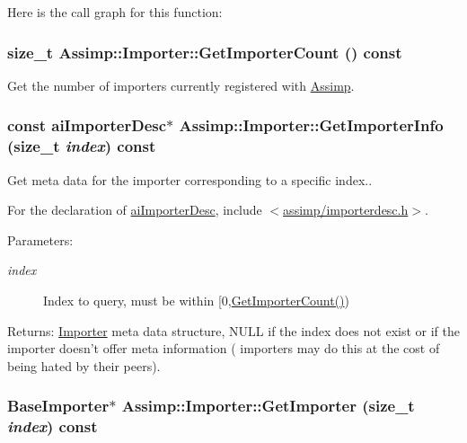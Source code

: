 Here is the call graph for this function:\hypertarget{class_assimp_1_1_importer_fe982451f1a1c9b0b59c788f9329ccc1}{
\subsubsection[GetImporterCount]{\setlength{\rightskip}{0pt plus 5cm}size\_\-t Assimp::Importer::GetImporterCount () const}}
\label{class_assimp_1_1_importer_fe982451f1a1c9b0b59c788f9329ccc1}


Get the number of importers currently registered with \hyperlink{namespace_assimp}{Assimp}. \hypertarget{class_assimp_1_1_importer_857dd22e071521c7747dc909f6a8f6f9}{
\subsubsection[GetImporterInfo]{\setlength{\rightskip}{0pt plus 5cm}const {\bf aiImporterDesc}$\ast$ Assimp::Importer::GetImporterInfo (size\_\-t {\em index}) const}}
\label{class_assimp_1_1_importer_857dd22e071521c7747dc909f6a8f6f9}


Get meta data for the importer corresponding to a specific index..

For the declaration of \hyperlink{structai_importer_desc}{aiImporterDesc}, include $<$\hyperlink{importerdesc_8h}{assimp/importerdesc.h}$>$. \begin{Desc}
\item[Parameters:]
\begin{description}
\item[{\em index}]Index to query, must be within \mbox{[}0,\hyperlink{class_assimp_1_1_importer_fe982451f1a1c9b0b59c788f9329ccc1}{GetImporterCount()}) \end{description}
\end{Desc}
\begin{Desc}
\item[Returns:]\hyperlink{class_assimp_1_1_importer}{Importer} meta data structure, NULL if the index does not exist or if the importer doesn't offer meta information ( importers may do this at the cost of being hated by their peers). \end{Desc}
\hypertarget{class_assimp_1_1_importer_712a0545a11c9d198392867552ba6646}{
\subsubsection[GetImporter]{\setlength{\rightskip}{0pt plus 5cm}BaseImporter$\ast$ Assimp::Importer::GetImporter (size\_\-t {\em index}) const}}
\label{class_assimp_1_1_importer_712a0545a11c9d198392867552ba6646}


